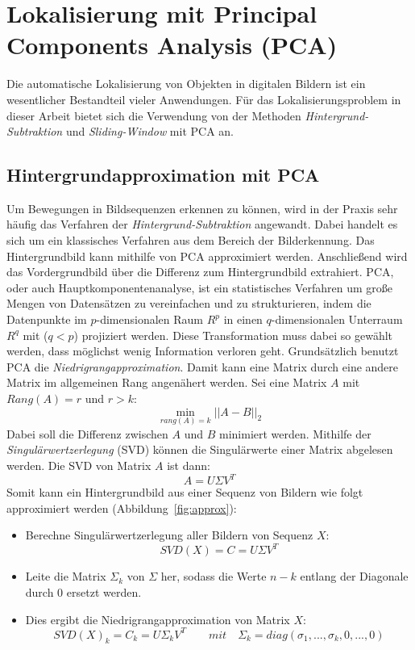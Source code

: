 \section{ Lokalisierung mit Principal Components Analysis (PCA)} \label{sec:PCA}
Die automatische Lokalisierung von Objekten in digitalen Bildern ist ein wesentlicher Bestandteil vieler Anwendungen. 
Für das Lokalisierungsproblem in dieser Arbeit bietet sich die Verwendung von der Methoden \textit{Hintergrund-Subtraktion} und \textit{Sliding-Window} mit PCA an.

\subsection{Hintergrundapproximation mit PCA}
Um Bewegungen in Bildsequenzen erkennen zu können, wird in der Praxis sehr häufig das Verfahren der \textit{Hintergrund-Subtraktion} angewandt. Dabei handelt es sich um ein klassisches Verfahren aus dem Bereich der Bilderkennung. Das Hintergrundbild kann mithilfe von PCA approximiert werden. Anschließend wird das Vordergrundbild über die Differenz zum Hintergrundbild extrahiert. PCA, oder auch Hauptkomponentenanalyse, ist ein statistisches Verfahren um große Mengen von Datensätzen zu vereinfachen und zu strukturieren, indem die Datenpunkte im $p$-dimensionalen Raum $R^p$ in einen $q$-dimensionalen Unterraum ${R} ^{q}$ mit ($q<p$) projiziert werden. Diese Transformation muss dabei so gewählt werden, dass möglichst wenig Information verloren geht.
Grundsätzlich benutzt PCA die \textit{Niedrigrangapproximation}. Damit kann eine Matrix durch eine andere Matrix im allgemeinen Rang angenähert werden. Sei eine Matrix $A$ mit $Rang(A) = r$ und $r > k$:
\begin{equation}
\min_{rang(A)=k}||A-B||_2 
\end{equation}
Dabei soll die Differenz zwischen $A$ und $B$ minimiert werden. Mithilfe der \textit{Singulärwertzerlegung} (SVD) können die Singulärwerte einer Matrix abgelesen werden. Die SVD von Matrix $A$ ist dann:
\begin{equation}
A = U \Sigma V^T
\end{equation}
Somit kann ein Hintergrundbild aus einer Sequenz von Bildern wie folgt approximiert werden (Abbildung~\ref{fig:approx}):
\begin{itemize}
\item{Berechne Singulärwertzerlegung aller Bildern von Sequenz $X$:}
\begin{equation}
SVD(X)= C = U \Sigma V^T
\end{equation}
\item{Leite die Matrix ${\Sigma_k}$ von ${\Sigma}$ her, sodass die Werte ${n - k}$  entlang der Diagonale durch 0 ersetzt werden.}
\item{Dies ergibt die Niedrigrangapproximation von Matrix $X$:}
\begin{equation}
SVD(X)_k=C_k = U\Sigma_kV^T \quad\quad mit  \quad  \Sigma_k = diag(\sigma_1, ..., \sigma_k,0,...,0)
\end{equation}
\end{itemize}
